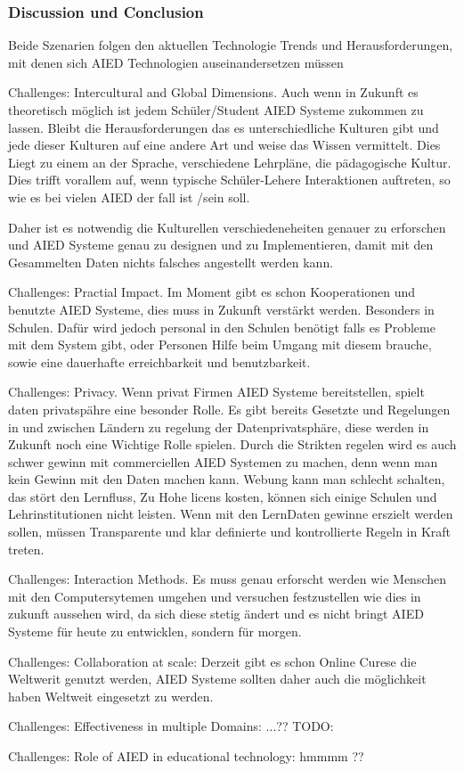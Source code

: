 \subsubsection{Discussion und Conclusion}
Beide Szenarien folgen den aktuellen Technologie Trends und Herausforderungen, mit denen sich AIED Technologien auseinandersetzen müssen

Challenges: Intercultural and Global Dimensions. Auch wenn in Zukunft es theoretisch möglich ist jedem Schüler/Student AIED Systeme zukommen zu lassen.
 Bleibt die Herausforderungen das es unterschiedliche Kulturen gibt und jede dieser Kulturen auf eine andere Art und weise das Wissen vermittelt. Dies Liegt zu einem an der Sprache, 
 verschiedene Lehrpläne, die pädagogische Kultur. Dies trifft vorallem auf, wenn typische Schüler-Lehere Interaktionen auftreten, so wie es bei vielen AIED der fall ist /sein soll.

 Daher ist es notwendig die Kulturellen verschiedeneheiten genauer zu erforschen und AIED Systeme genau zu designen und zu Implementieren, damit mit den Gesammelten Daten nichts falsches angestellt werden kann.

 Challenges: Practial Impact. Im Moment gibt es schon Kooperationen und benutzte AIED Systeme, dies muss in Zukunft verstärkt werden. Besonders in Schulen. Dafür wird jedoch personal in den Schulen benötigt
 falls es Probleme mit dem System gibt, oder Personen Hilfe beim Umgang mit diesem brauche, sowie eine dauerhafte erreichbarkeit und benutzbarkeit.


 Challenges: Privacy. Wenn privat Firmen AIED Systeme bereitstellen, spielt daten privatspähre eine besonder Rolle. Es gibt bereits Gesetzte und Regelungen in und zwischen Ländern zu regelung der Datenprivatsphäre, diese 
 werden in Zukunft noch eine Wichtige Rolle spielen. Durch die Strikten regelen wird es auch schwer gewinn mit commerciellen AIED Systemen zu machen, denn wenn man kein Gewinn mit den Daten machen kann. Webung kann man schlecht schalten, das stört den Lernfluss,
 Zu Hohe licens kosten, können sich einige Schulen und Lehrinstitutionen nicht leisten. Wenn mit den LernDaten gewinne erszielt werden sollen, müssen Transparente und klar definierte und kontrollierte Regeln in Kraft treten.


 Challenges: Interaction Methods. Es muss genau erforscht werden wie Menschen mit den Computersytemen umgehen und versuchen festzustellen wie dies in zukunft aussehen wird, da sich diese stetig ändert und es nicht bringt
 AIED Systeme für heute zu entwicklen, sondern für morgen.


 Challenges: Collaboration at scale: Derzeit gibt es schon Online Curese die Weltwerit genutzt werden, AIED Systeme sollten daher auch die möglichkeit haben Weltweit eingesetzt zu werden.

 Challenges: Effectiveness in multiple Domains: ...?? TODO:


 Challenges: Role of AIED in educational technology: hmmmm ??
